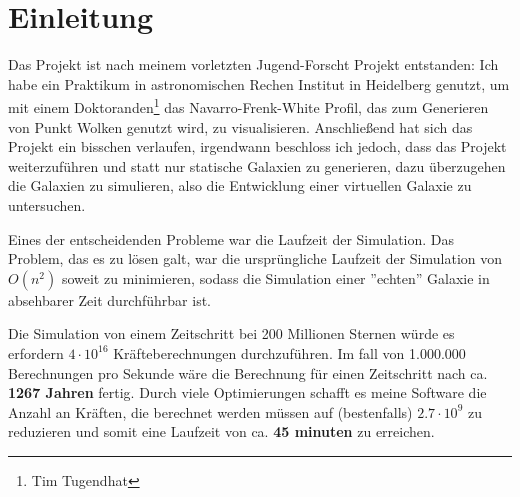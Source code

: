 \section{Einleitung}
Das Projekt ist nach meinem vorletzten Jugend-Forscht Projekt entstanden: Ich
habe ein Praktikum in astronomischen Rechen Institut in Heidelberg genutzt, um
mit einem Doktoranden\footnote{Tim Tugendhat} das Navarro-Frenk-White Profil,
das zum Generieren von Punkt Wolken genutzt wird, zu visualisieren.
Anschließend hat sich das Projekt ein bisschen verlaufen, irgendwann beschloss
ich jedoch, dass das Projekt weiterzuführen und statt nur statische Galaxien zu
generieren, dazu überzugehen die Galaxien zu simulieren, also die Entwicklung
einer virtuellen Galaxie zu untersuchen.\\\par Eines der entscheidenden
Probleme war die Laufzeit der Simulation. Das Problem, das es zu lösen galt,
war die ursprüngliche Laufzeit der Simulation von \(O(n^2)\) soweit zu
minimieren, sodass die Simulation einer ''echten'' Galaxie in absehbarer Zeit
durchführbar ist.\\\par Die Simulation von einem Zeitschritt bei 200 Millionen
Sternen würde es erfordern \(4 \cdot 10^{16} \) Kräfteberechnungen
durchzuführen. Im fall von 1.000.000 Berechnungen pro Sekunde wäre die
Berechnung für einen Zeitschritt nach ca. \textbf{1267 Jahren} fertig. Durch
viele Optimierungen schafft es meine Software die Anzahl an Kräften, die
berechnet werden müssen auf (bestenfalls) \( 2.7 \cdot 10^{9} \) zu reduzieren
und somit eine Laufzeit von ca. \textbf{45 minuten} zu erreichen.
